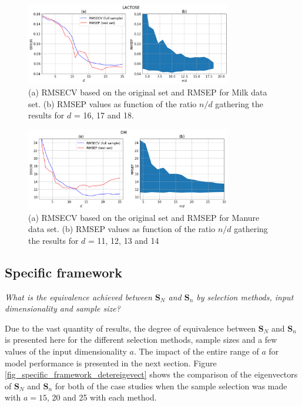 \documentclass[journal=ancham,manuscript=article]{achemso}
\begin{document}
\begin{figure}[b]
\includegraphics[width=0.8\textwidth]{manuscript/figures/d01_milk_general_framework.png}
\centering
\caption{(a) RMSECV based on the original set and RMSEP for Milk data set. (b) RMSEP values as function of the ratio $n/d$ gathering the results for $d$ = 16, 17 and 18.}
\label{fig_d01_milk_general_framework}
\end{figure}

\begin{figure}[b]
\includegraphics[width=0.8\textwidth]{manuscript/figures/d02_manure_general_framework.png}
\centering
\caption{(a) RMSECV based on the original set and RMSEP for Manure data set. (b) RMSEP values as function of the ratio $n/d$ gathering the results for $d$ = 11, 12, 13 and 14}
\label{fig_d02_manure_general_framework}
\end{figure}

\subsection*{Specific framework}\label{results:specframework}

\emph{What is the equivalence achieved between $\mathbf{S}_N$ and $\mathbf{S}_n$ by selection methods, input dimensionality and sample size?} 

Due to the vast quantity of results, the degree of equivalence between $\mathbf{S}_N$ and $\mathbf{S}_n$ is presented here for the different selection methods, sample sizes and a few values of the input dimensionality $a$. The impact of the entire range of $a$ for model performance is presented in the next section. Figure \ref{fig_specific_framework_detereigevect} shows the comparison of the eigenvectors of $\mathbf{S}_N$ and $\mathbf{S}_n$ for both of the case studies when the sample selection was made with $a=15$, 20 and 25 with each method. 
\end{document}
